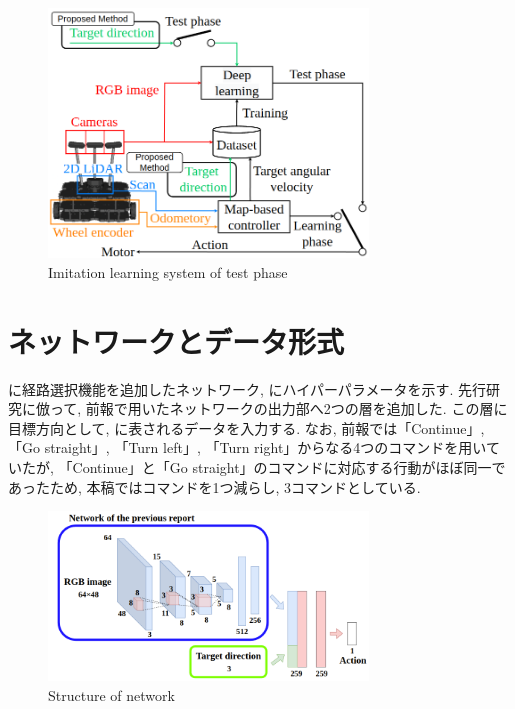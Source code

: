 \documentclass{jarticle}
\begin{document}
\begin{figure}[H]
  \centering
   \includegraphics[width=85mm]{system2.png}
   \vspace*{-4mm}
   \caption{Imitation learning system of test phase}
   \label{fig: fig3}
 \end{figure}

\section{ネットワークとデータ形式}
に経路選択機能を追加したネットワーク, にハイパーパラメータを示す. 
先行研究に倣って, 前報で用いたネットワークの出力部へ2つの層を追加した. この層に目標方向として, 
に表されるデータを入力する. なお, 前報\cite{mech}では「Continue」, 「Go straight」, 「Turn left」, 「Turn right」からなる4つのコマンドを用いていたが, 「Continue」と「Go straight」のコマンドに対応する行動がほぼ同一であったため, 本稿ではコマンドを1つ減らし, 3コマンドとしている. 

\begin{figure}[h]
  \centering
   \includegraphics[width=85mm]{network.png}
   \vspace*{-4mm}
   \caption{Structure of network}
   \label{fig: fig4}
 \end{figure}
\end{document}
